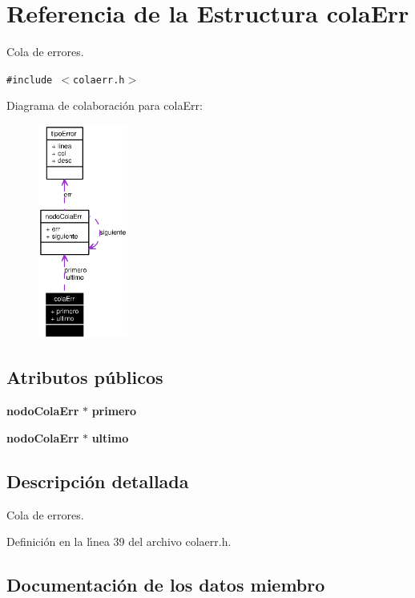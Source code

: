 \section{Referencia de la Estructura cola\-Err}
\label{structcolaErr}
Cola de errores.  


{\tt \#include $<$colaerr.h$>$}

Diagrama de colaboraci\'{o}n para cola\-Err:\begin{figure}[H]
\begin{center}
\leavevmode
\includegraphics[width=83pt]{structcolaErr__coll__graph}
\end{center}
\end{figure}
\subsection*{Atributos p\'{u}blicos}
\begin{CompactItemize}
\item 
{\bf nodo\-Cola\-Err} $\ast$ {\bf primero}
\item 
{\bf nodo\-Cola\-Err} $\ast$ {\bf ultimo}
\end{CompactItemize}


\subsection{Descripci\'{o}n detallada}
Cola de errores. 



Definici\'{o}n en la l\'{\i}nea 39 del archivo colaerr.h.

\subsection{Documentaci\'{o}n de los datos miembro}
